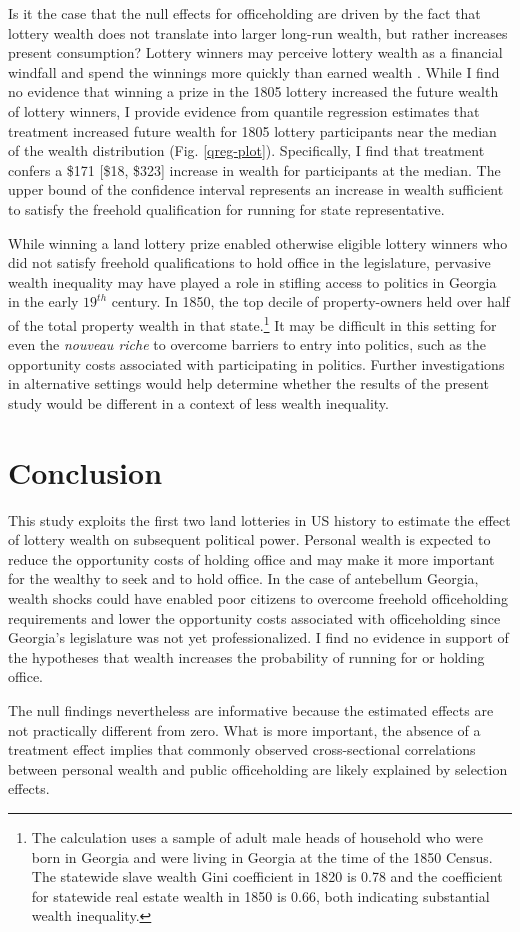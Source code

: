 Is it the case that the null effects for officeholding are driven by the fact that lottery wealth does not translate into larger long-run wealth, but rather increases present consumption? Lottery winners may perceive lottery wealth as a financial windfall and spend the winnings more quickly than earned wealth \citep{doherty2006}. While I find no evidence that winning a prize in the 1805 lottery increased the future wealth of lottery winners, I provide evidence from quantile regression estimates that treatment increased future wealth for 1805 lottery participants near the median of the wealth distribution (Fig. \ref{qreg-plot}). Specifically, I find that treatment confers a \$171 [\$18, \$323] increase in wealth for participants at the median. The upper bound of the confidence interval represents an increase in wealth sufficient to satisfy the freehold qualification for running for state representative. 

While winning a land lottery prize enabled otherwise eligible lottery winners who did not satisfy freehold qualifications to hold office in the legislature, pervasive wealth inequality may have played a role in stifling access to politics in Georgia in the early $19^{th}$ century. In 1850, the top decile of property-owners held over half of the total property wealth in that state.\footnote{The calculation uses a sample of adult male heads of household who were born in Georgia and were living in Georgia at the time of the 1850 Census. The statewide slave wealth Gini coefficient in 1820 is 0.78 and the coefficient for statewide real estate wealth in 1850 is 0.66, both indicating substantial wealth inequality.} It may be difficult in this setting for even the \textit{nouveau riche} to overcome barriers to entry into politics, such as the opportunity costs associated with participating in politics. Further investigations in alternative settings would help determine whether the results of the present study would be different in a context of less wealth inequality. 

\section{Conclusion} \label{conclusion} 

This study exploits the first two land lotteries in US history to estimate the effect of lottery wealth on subsequent political power. Personal wealth is expected to reduce the opportunity costs of holding office and may make it more important for the wealthy to seek and to hold office. In the case of antebellum Georgia, wealth shocks could have enabled poor citizens to overcome freehold officeholding requirements and lower the opportunity costs associated with officeholding since Georgia's legislature was not yet professionalized. I find no evidence in support of the hypotheses that wealth increases the probability of running for or holding office. 

The null findings nevertheless are informative because the estimated effects are not practically different from zero. What is more important, the absence of a treatment effect implies that commonly observed cross-sectional correlations between personal wealth and public officeholding are likely explained by selection effects. 